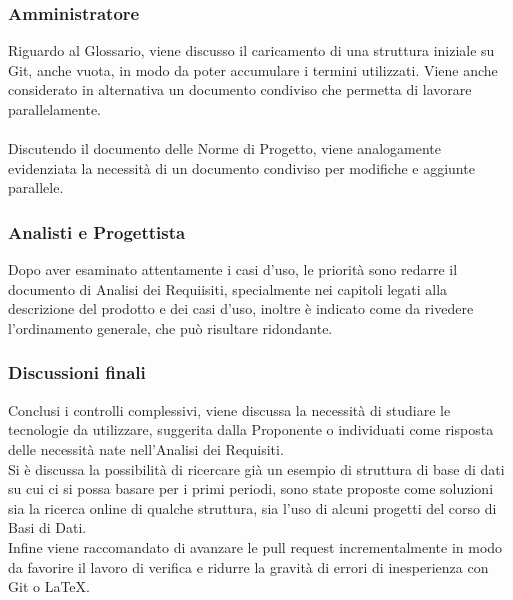 \subsubsection{Amministratore}
Riguardo al Glossario, viene discusso il caricamento di una struttura iniziale su Git, anche vuota, in modo da poter accumulare i termini utilizzati. Viene anche considerato in alternativa un documento condiviso che permetta di lavorare parallelamente.\\
\\
Discutendo il documento delle Norme di Progetto, viene analogamente evidenziata la necessità di un documento condiviso per modifiche e aggiunte parallele.

\subsubsection{Analisti e Progettista}
Dopo aver esaminato attentamente i casi d'uso, le priorità sono redarre il documento di Analisi dei Requiisiti, specialmente nei capitoli legati alla descrizione del prodotto e dei casi d'uso, inoltre è indicato come da rivedere l'ordinamento generale, che può risultare ridondante.

\subsubsection{Discussioni finali}
Conclusi i controlli complessivi, viene discussa la necessità di studiare le tecnologie da utilizzare, suggerita dalla Proponente o individuati come risposta delle necessità nate nell'Analisi dei Requisiti.\\
Si è discussa la possibilità di ricercare già un esempio di struttura di base di dati su cui ci si possa basare per i primi periodi, sono state proposte come soluzioni sia la ricerca online di qualche struttura, sia l'uso di alcuni progetti del corso di Basi di Dati.\\
Infine viene raccomandato di avanzare le pull request incrementalmente in modo da favorire il lavoro di verifica e ridurre la gravità di errori di inesperienza con Git o LaTeX.